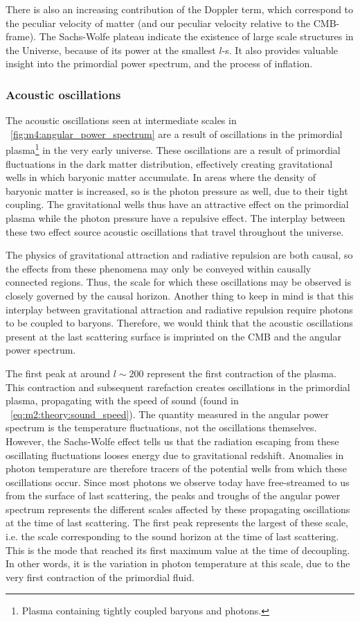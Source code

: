         There is also an increasing contribution of the Doppler term, which correspond to the peculiar velocity of matter (and our peculiar velocity relative to the CMB-frame). The Sachs-Wolfe plateau indicate the existence of large scale structures in the Universe, because of its power at the smallest $l$-s. It also provides valuable insight into the primordial power spectrum, and the process of inflation. 

    \subsubsection{Acoustic oscillations}
        The acoustic oscillations seen at intermediate scales in ~\cref{fig:m4:angular_power_spectrum} are a result of oscillations in the primordial plasma\footnote{Plasma containing tightly coupled baryons and photons.} in the very early universe. These oscillations are a result of primordial fluctuations in the dark matter distribution, effectively creating gravitational wells in which baryonic matter accumulate. In areas where the density of baryonic matter is increased, so is the photon pressure as well, due to their tight coupling. The gravitational wells thus have an attractive effect on the primordial plasma while the photon pressure have a repulsive effect. The interplay between these two effect source acoustic oscillations that travel throughout the universe. 

        The physics of gravitational attraction and radiative repulsion are both causal, so the effects from these phenomena may only be conveyed within causally connected regions. Thus, the scale for which these oscillations may be observed is closely governed by the causal horizon. Another thing to keep in mind is that this interplay between gravitational attraction and radiative repulsion require photons to be coupled to baryons. Therefore, we would think that the acoustic oscillations present at the last scattering surface is imprinted on the CMB and the angular power spectrum.

        The first peak at around $l\sim200$ represent the first contraction of the plasma. This contraction and subsequent rarefaction creates oscillations in the primordial plasma, propagating with the speed of sound (found in ~\cref{eq:m2:theory:sound_speed}). The quantity measured in the angular power spectrum is the temperature fluctuations, not the oscillations themselves. However, the Sachs-Wolfe effect tells us that the radiation escaping from these oscillating fluctuations looses energy due to gravitational redshift. Anomalies in photon temperature are therefore tracers of the potential wells from which these oscillations occur. Since most photons we observe today have free-streamed to us from the surface of last scattering, the peaks and troughs of the angular power spectrum represents the different scales affected by these propagating oscillations at the time of last scattering. The first peak represents the largest of these scale, i.e. the scale corresponding to the sound horizon at the time of last scattering. This is the mode that reached its first maximum value at the time of decoupling. In other words, it is the variation in photon temperature at this scale, due to the very first contraction of the primordial fluid. 

